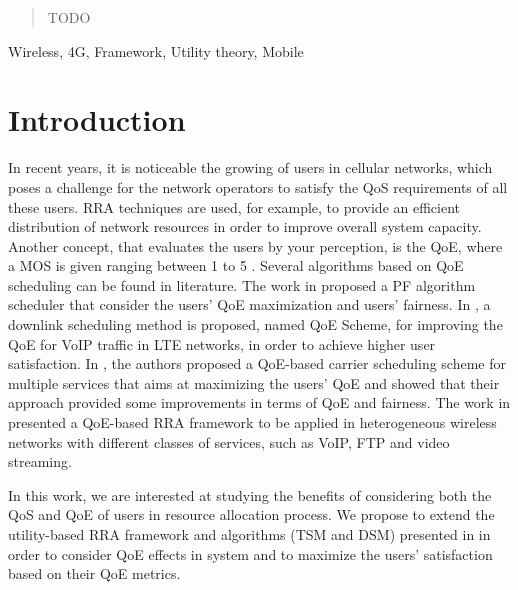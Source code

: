 \documentclass[conference]{IEEEtran}
\begin{document}
\maketitle

\begin{abstract}
TODO
\end{abstract}

\begin{IEEEkeywords}
Wireless, 4G, Framework, Utility theory, Mobile
\end{IEEEkeywords}

\section{Introduction}
In recent years, it is noticeable the growing of users in cellular networks, which poses a challenge for the network operators to satisfy the \ac{QoS} requirements of all these users. \ac{RRA} techniques are used, for example, to provide an efficient distribution of network resources in order to improve overall system capacity. Another concept, that evaluates the users by your perception, is the \ac{QoE}, where a \ac{MOS} is given ranging between 1 to 5 \cite{ITU1996}. 
Several algorithms based on \ac{QoE} scheduling can be found in literature. The work in \cite{cho2015qoe} proposed a \ac{PF} algorithm scheduler that consider the  users' \ac{QoE} maximization and users' fairness. In \cite{mushtaq2014qoe}, a downlink scheduling method is proposed, named QoE Scheme, for improving the \ac{QoE} for \ac{VoIP} traffic in \ac{LTE} networks, in order to achieve higher user satisfaction. In \cite{liu2012novel}, the authors proposed a \ac{QoE}-based carrier scheduling scheme for multiple services that aims at maximizing the users' \ac{QoE} and showed that their approach provided some improvements in terms of QoE and fairness. The work in \cite{toseef2011user} presented a \ac{QoE}-based \ac{RRA} framework to be applied in heterogeneous wireless networks with different classes of services, such as \ac{VoIP}, \ac{FTP} and video streaming. 

In this work, we are interested at studying the benefits of considering both the \ac{QoS} and \ac{QoE} of users in resource allocation process. We propose to extend the utility-based \ac{RRA} framework and algorithms (\ac{TSM} and \ac{DSM}) presented in \cite{Rodrigues2014_Wiley} in order to consider \ac{QoE} effects in system and to maximize the users' satisfaction based on their \ac{QoE} metrics.

\end{document}
